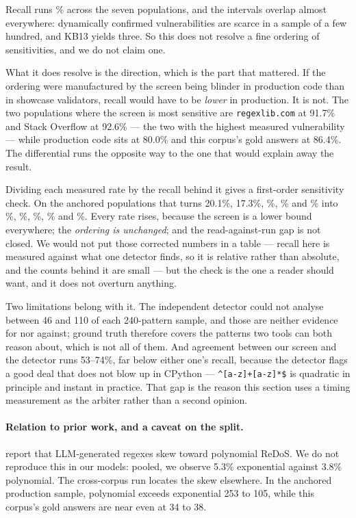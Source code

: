 \documentclass[11pt]{article}
\begin{document}
Recall runs \recallrange{}\% across the seven populations, and the intervals
overlap almost everywhere: dynamically confirmed vulnerabilities are scarce in
a sample of a few hundred, and KB13 yields three. So this does not resolve a
fine ordering of sensitivities, and we do not claim one.

What it does resolve is the direction, which is the part that mattered. If the
ordering were manufactured by the screen being blinder in production code than
in showcase validators, recall would have to be \emph{lower} in production.
It is not. The two populations where the screen is most sensitive are
\texttt{regexlib.com} at 91.7\% and Stack Overflow at 92.6\% --- the two with
the highest measured vulnerability --- while production code sits at 80.0\%
and this corpus's gold answers at 86.4\%. The differential runs the opposite
way to the one that would explain away the result.

Dividing each measured rate by the recall behind it gives a first-order
sensitivity check. On the anchored populations that turns 20.1\%, 17.3\%,
\anchoredgold{}\%, \anchoredmodels{}\% and \anchoredprod{}\% into
\corrlib{}\%, \corrso{}\%, \corrgold{}\%, \corrmodels{}\% and \corrprod{}\%.
Every rate rises, because the screen is a lower bound everywhere; the
\emph{ordering is unchanged}; and the read-against-run gap is not closed. We
would not put those corrected numbers in a table --- recall here is measured
against what one detector finds, so it is relative rather than absolute, and
the counts behind it are small --- but the check is the one a reader should
want, and it does not overturn anything.

Two limitations belong with it. The independent detector could not analyse
between 46 and 110 of each 240-pattern sample, and those are neither evidence
for nor against; ground truth therefore covers the patterns two tools can both
reason about, which is not all of them. And agreement between our screen and
the detector runs 53--74\%, far below either one's recall, because the
detector flags a good deal that does not blow up in CPython ---
\lstinline!^[a-z]+[a-z]*$! is quadratic in principle and instant in practice.
That gap is the reason this section uses a timing measurement as the arbiter
rather than a second opinion.

\paragraph{Relation to prior work, and a caveat on the split.}
\citet{siddiq2024redos} report that LLM-generated regexes skew toward
polynomial ReDoS. We do not reproduce this in our models: pooled, we observe
5.3\% exponential against 3.8\% polynomial. The cross-corpus run locates the
skew elsewhere. In the anchored production sample, polynomial exceeds
exponential 253 to 105, while this corpus's gold answers are near even at 34
to 38.
\end{document}

